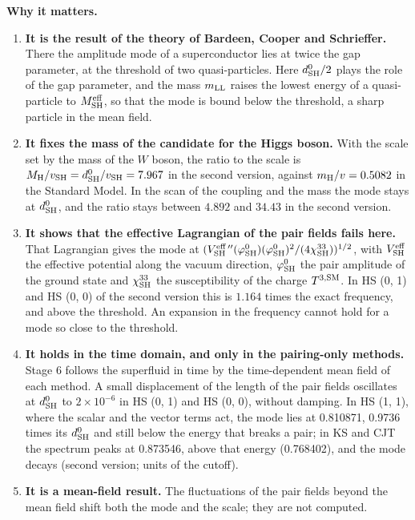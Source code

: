\documentclass[
  10pt,
]{article}
\providecommand{\tightlist}{%
  \setlength{\itemsep}{0pt}\setlength{\parskip}{0pt}}
\begin{document}
\textbf{Why it matters.}

\begin{enumerate}
\def\labelenumi{\arabic{enumi}.}
\tightlist
\item
  \textbf{It is the result of the theory of Bardeen, Cooper and
  Schrieffer.} There the amplitude mode of a superconductor lies at
  twice the gap parameter, at the threshold of two quasi-particles. Here
  \(d^0_{\rm SH}/2\) plays the role of the gap parameter, and the mass
  \(m_{\rm LL}\) raises the lowest energy of a quasi-particle to
  \(M^{\rm eff}_{\rm SH}\), so that the mode is bound below the
  threshold, a sharp particle in the mean field.
\item
  \textbf{It fixes the mass of the candidate for the Higgs boson.} With
  the scale set by the mass of the \(W\) boson, the ratio to the scale
  is \(M_{\rm H}/v_{\rm SH}=d^0_{\rm SH}/v_{\rm SH}=7.967\) in the
  second version, against \(m_{\rm H}/v=0.5082\) in the Standard Model.
  In the scan of the coupling and the mass the mode stays at
  \(d^0_{\rm SH}\), and the ratio stays between \(4.892\) and \(34.43\)
  in the second version.
\item
  \textbf{It shows that the effective Lagrangian of the pair fields
  fails here.} That Lagrangian gives the mode at
  \((V^{\rm eff\,\prime\prime}_{\rm SH}(\varphi^0_{\rm SH})(\varphi^0_{\rm SH})^2/(4\chi^{33}_{\rm SH}))^{1/2}\),
  with \(V^{\rm eff}_{\rm SH}\) the effective potential along the vacuum
  direction, \(\varphi^0_{\rm SH}\) the pair amplitude of the ground
  state and \(\chi^{33}_{\rm SH}\) the susceptibility of the charge
  \(T^{3,{\rm SM}}\). In HS (0, 1) and HS (0, 0) of the second version
  this is \(1.164\) times the exact frequency, and above the threshold.
  An expansion in the frequency cannot hold for a mode so close to the
  threshold.
\item
  \textbf{It holds in the time domain, and only in the pairing-only
  methods.} Stage 6 follows the superfluid in time by the time-dependent
  mean field of each method. A small displacement of the length of the
  pair fields oscillates at \(d^0_{\rm SH}\) to \(2\times10^{-6}\) in HS
  (0, 1) and HS (0, 0), without damping. In HS (1, 1), where the scalar
  and the vector terms act, the mode lies at 0.810871, 0.9736 times its
  \(d^0_{\rm SH}\) and still below the energy that breaks a pair; in KS
  and CJT the spectrum peaks at 0.873546, above that energy (0.768402),
  and the mode decays (second version; units of the cutoff).
\item
  \textbf{It is a mean-field result.} The fluctuations of the pair
  fields beyond the mean field shift both the mode and the scale; they
  are not computed.
\end{enumerate}
\end{document}
